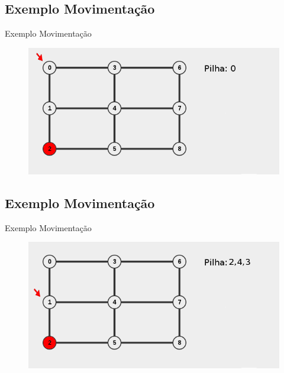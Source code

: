 \documentclass{beamer}
\begin{document}
\subsection{Exemplo Movimentação}
\begin{frame}
  Exemplo Movimentação
    \begin{figure}
    \centering
    \includegraphics[width=0.9\linewidth]{software_1}
  \end{figure}
\end{frame}

\subsection{Exemplo Movimentação}
\begin{frame}
  Exemplo Movimentação
    \begin{figure}
    \centering
    \includegraphics[width=0.9\linewidth]{software_2}
  \end{figure}
\end{frame}
\end{document}
